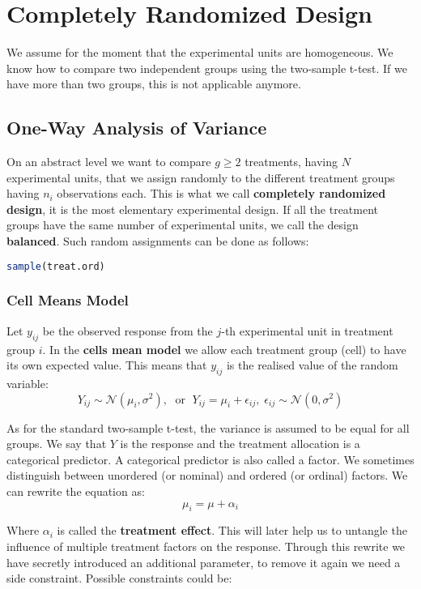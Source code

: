 \section{Completely Randomized Design}

We assume for the moment that the experimental units are homogeneous. We know how to compare two independent groups using the two-sample t-test. If we have more than two groups, this is not applicable anymore.


\subsection{One-Way Analysis of Variance}

On an abstract level we want to compare $g \geq 2$ treatments, having $N$ experimental units, that we assign randomly to the different treatment groups having $n_i$ observations each. This is what we call \textbf{completely randomized design}, it is the most elementary experimental design. If all the treatment groups have the same number of experimental units, we call the design \textbf{balanced}. Such random assignments can be done as follows:

\begin{lstlisting}[language=R]
sample(treat.ord)
\end{lstlisting}

\subsubsection{Cell Means Model}

Let $y_{ij}$ be the observed response from the $j$-th experimental unit in treatment group $i$. In the \textbf{cells mean model} we allow each treatment group (cell) to have its own expected value. This means that $y_{ij}$ is the realised value of the random variable:
$$Y_{ij} \sim \mathcal N(\mu_i, \sigma^2), \; \text{ or } \; Y_{ij} = \mu_i + \epsilon_{ij}, \;\epsilon_{ij} \sim \mathcal N(0, \sigma^2)$$

As for the standard two-sample t-test, the variance is assumed to be equal for all groups. We say that $Y$ is the response and the treatment allocation is a categorical predictor. A categorical predictor is also called a factor. We sometimes distinguish between unordered (or nominal) and ordered (or ordinal) factors. We can rewrite the equation as:
$$\mu_i = \mu + \alpha_i$$

Where $\alpha_i$ is called the \textbf{treatment effect}. This will later help us to untangle the influence of multiple treatment factors on the response. Through this rewrite we have secretly introduced an additional parameter, to remove it again we need a side constraint. Possible constraints could be:

